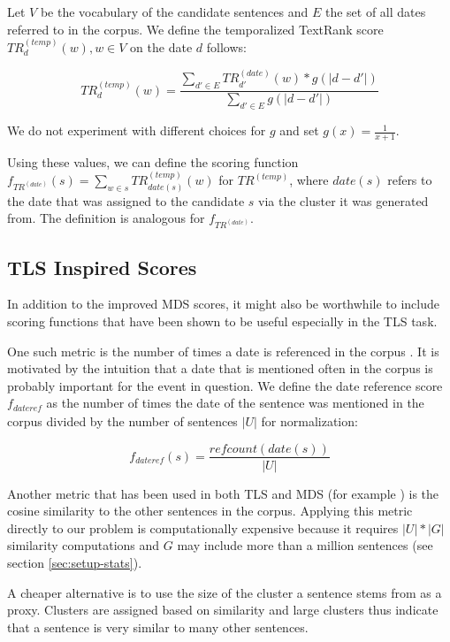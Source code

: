 \documentclass[a4paper,BCOR=10mm]{report}
\numberwithin{lemma}{chapter}
\numberwithin{definition}{chapter}
\begin{document}
Let $V$ be the vocabulary of the candidate sentences and $E$ the set of all dates referred to in the corpus. We define the temporalized TextRank score $TR^{(temp)}_d(w), w \in V$ on the date $d$ follows:

\begin{equation}
    TR^{(temp)}_d(w) = \frac{\sum_{d' \in E} TR^{(date)}_{d'}(w) * g(|d - d'|)}{\sum_{d' \in E} g(|d - d'|)}
\end{equation}

We do not experiment with different choices for $g$ and set $g(x) = \frac{1}{x + 1}$.

Using these values, we can define the scoring function $f_{TR^{(date)}}(s) = \sum_{w \in s} TR^{(temp)}_{\mathit{date}(s)}(w)$ for $TR^{(temp)}$, where $\mathit{date}(s)$ refers to the date that was assigned to the candidate $s$ via the cluster it was generated from.
The definition is analogous for $f_{TR^{(date)}}$.

\subsection{TLS Inspired Scores} \label{sec:tls-scores}

In addition to the improved MDS scores, it might also be worthwhile to include scoring functions that have been shown to be useful especially in the TLS task.

One such metric is the number of times a date is referenced in the corpus \citep{markert, tran-datesel}. It is motivated by the intuition that a date that is mentioned often in the corpus is probably important for the event in question. We define the date reference score $f_{\mathit{dateref}}$ as the number of times the date of the sentence was mentioned in the corpus divided by the number of sentences $|U|$ for normalization:

\begin{equation}
f_{\mathit{dateref}}(s) = \frac{\mathit{refcount}(\mathit{date}(s))}{|U|}
\end{equation}

Another metric that has been used in both TLS \citep{chieu} and MDS (for example \citet{lexrank}) is the cosine similarity to the other sentences in the corpus.
Applying this metric directly to our problem is computationally expensive because it requires $|U| * |G|$ similarity computations and $G$ may include more than a million sentences (see section \ref{sec:setup-stats}).

A cheaper alternative is to use the size of the cluster a sentence stems from as a proxy. Clusters are assigned based on similarity and large clusters thus indicate that a sentence is very similar to many other sentences.
\end{document}
